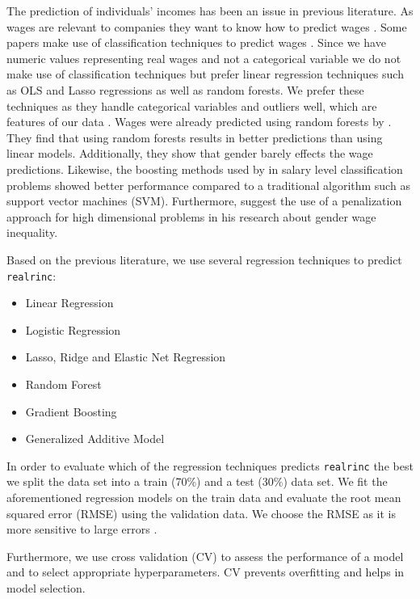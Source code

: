\documentclass[11pt,a4paper]{article}
\begin{document}
The prediction of individuals' incomes has been an issue in previous
literature. As wages are relevant to companies they want to know how to
predict wages \autocite{Chakraborti}. Some papers make use of
classification techniques to predict wages \autocite{Chakraborti}. Since
we have numeric values representing real wages and not a categorical
variable we do not make use of classification techniques but prefer
linear regression techniques such as OLS and Lasso regressions as well
as random forests. We prefer these techniques as they handle categorical
variables and outliers well, which are features of our data
\autocite{Cutler}. Wages were already predicted using random forests by
\autocite{Eichinger}. They find that using random forests results in
better predictions than using linear models. Additionally, they show
that gender barely effects the wage predictions. Likewise, the boosting
methods used by \autocite{Chakrabarty2018} in salary level
classification problems showed better performance compared to a
traditional algorithm such as support vector machines (SVM).
Furthermore, \textcite{BonaccoltoToepfer1612} suggest the use of a
penalization approach for high dimensional problems in his research
about gender wage inequality.

Based on the previous literature, we use several regression techniques
to predict \texttt{realrinc}:

\begin{itemize}
\item
  Linear Regression
\item
  Logistic Regression
\item
  Lasso, Ridge and Elastic Net Regression
\item
  Random Forest
\item
  Gradient Boosting
\item
  Generalized Additive Model
\end{itemize}

In order to evaluate which of the regression techniques predicts
\texttt{realrinc} the best we split the data set into a train (70\%) and
a test (30\%) data set. We fit the aforementioned regression models on
the train data and evaluate the root mean squared error (RMSE) using the
validation data. We choose the RMSE as it is more sensitive to large
errors \autocite{Arour}.

Furthermore, we use cross validation (CV) to assess the performance of a
model and to select appropriate hyperparameters. CV prevents overfitting
and helps in model selection.
\end{document}

